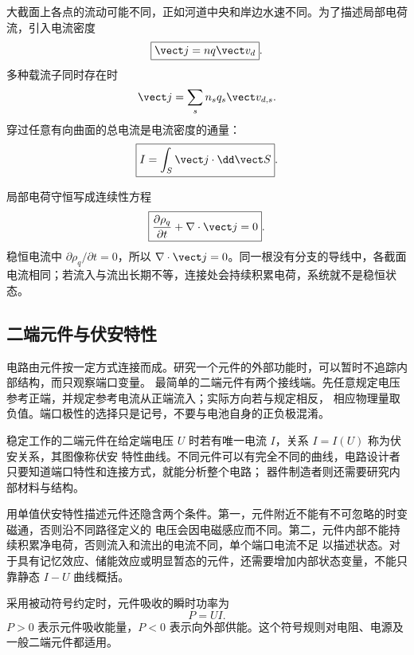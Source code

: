 大截面上各点的流动可能不同，正如河道中央和岸边水速不同。为了描述局部电荷流，引入电流密度
\begin{equation}
  \boxed{\vect j=nq\vect v_d}.
\end{equation}
多种载流子同时存在时
\begin{equation}
  \vect j=\sum_s n_sq_s\vect v_{d,s}.
\end{equation}
穿过任意有向曲面的总电流是电流密度的通量：
\begin{equation}
  \boxed{I=\int_S\vect j\cdot\dd\vect S}.
\end{equation}

\currentDensityDiagram

局部电荷守恒写成连续性方程
\begin{equation}
  \boxed{\frac{\partial\rho_q}{\partial t}+\nabla\cdot\vect j=0}.
\end{equation}
稳恒电流中 $\partial\rho_q/\partial t=0$，所以 $\nabla\cdot\vect j=0$。同一根没有分支的导线中，各截面
电流相同；若流入与流出长期不等，连接处会持续积累电荷，系统就不是稳恒状态。

\subsection*{二端元件与伏安特性}

电路由元件按一定方式连接而成。研究一个元件的外部功能时，可以暂时不追踪内部结构，而只观察端口变量。
最简单的二端元件有两个接线端。先任意规定电压参考正端，并规定参考电流从正端流入；实际方向若与规定相反，
相应物理量取负值。端口极性的选择只是记号，不要与电池自身的正负极混淆。

稳定工作的二端元件在给定端电压 $U$ 时若有唯一电流 $I$，关系 $I=I(U)$ 称为伏安关系，其图像称伏安
特性曲线。不同元件可以有完全不同的曲线，电路设计者只要知道端口特性和连接方式，就能分析整个电路；
器件制造者则还需要研究内部材料与结构。

\ivCharacteristicDiagram

用单值伏安特性描述元件还隐含两个条件。第一，元件附近不能有不可忽略的时变磁通，否则沿不同路径定义的
电压会因电磁感应而不同。第二，元件内部不能持续积累净电荷，否则流入和流出的电流不同，单个端口电流不足
以描述状态。对于具有记忆效应、储能效应或明显暂态的元件，还需要增加内部状态变量，不能只靠静态 $I-U$
曲线概括。

采用被动符号约定时，元件吸收的瞬时功率为
\begin{equation}
  \boxed{P=UI}.
\end{equation}
$P>0$ 表示元件吸收能量，$P<0$ 表示向外部供能。这个符号规则对电阻、电源及一般二端元件都适用。

